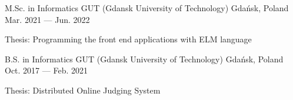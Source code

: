 

\begin{cventries}

  \cventry
    {M.Sc. in Informatics} %
    {GUT (Gdansk University of Technology)} %
    {Gdańsk, Poland} %
    {Mar. 2021 --- Jun. 2022} %
    {
      \begin{cvitems} %
        \item {Thesis: Programming the front end applications with ELM language}
      \end{cvitems}
    }

  \cventry
    {B.S. in Informatics} %
    {GUT (Gdansk University of Technology)} %
    {Gdańsk, Poland} %
    {Oct. 2017 --- Feb. 2021} %
    {
      \begin{cvitems} %
        \item {Thesis: Distributed Online Judging System}
      \end{cvitems}
    }

\end{cventries}

